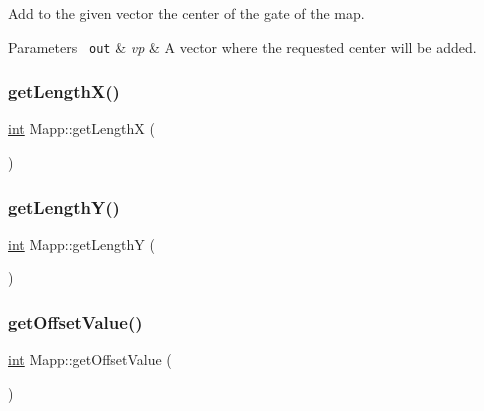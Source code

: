 Add to the given vector the center of the gate of the map. 


\begin{DoxyParams}[1]{Parameters}
\mbox{\texttt{ out}}  & {\em vp} & A vector where the requested center will be added. \\
\hline
\end{DoxyParams}
\mbox{\label{class_mapp_ac096fed408149529dd24872a79bffb52}} 
\subsubsection{\texorpdfstring{getLengthX()}{getLengthX()}}
{\footnotesize\ttfamily \mbox{\hyperlink{draw_8hh_aa620a13339ac3a1177c86edc549fda9b}{int}} Mapp\+::get\+LengthX (\begin{DoxyParamCaption}{ }\end{DoxyParamCaption})\hspace{0.3cm}{\ttfamily [inline]}}

\mbox{\label{class_mapp_a809dabaf3b443c877d1a51c0a8cea1d2}} 
\subsubsection{\texorpdfstring{getLengthY()}{getLengthY()}}
{\footnotesize\ttfamily \mbox{\hyperlink{draw_8hh_aa620a13339ac3a1177c86edc549fda9b}{int}} Mapp\+::get\+LengthY (\begin{DoxyParamCaption}{ }\end{DoxyParamCaption})\hspace{0.3cm}{\ttfamily [inline]}}

\mbox{\label{class_mapp_ae67f05c7e6ddb6dbff4da049016e96bd}} 
\subsubsection{\texorpdfstring{getOffsetValue()}{getOffsetValue()}}
{\footnotesize\ttfamily \mbox{\hyperlink{draw_8hh_aa620a13339ac3a1177c86edc549fda9b}{int}} Mapp\+::get\+Offset\+Value (\begin{DoxyParamCaption}{ }\end{DoxyParamCaption})\hspace{0.3cm}{\ttfamily [inline]}}

